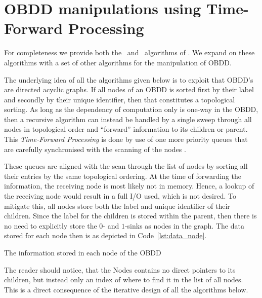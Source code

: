 \newpage
\section{OBDD manipulations using Time-Forward Processing} \label{sec:theory}

For completeness we provide both the \Reduce\ and \Apply\ algorithms of
\cite{Arge96}. We expand on these algorithms with a set of other algorithms for
the manipulation of OBDD.

The underlying idea of all the algorithms given below is to exploit that OBDD's
are directed acyclic graphs. If all nodes of an OBDD is sorted first by their
label and secondly by their unique identifier, then that constitutes a
topological sorting. As long as the dependency of computation only is one-way in
the OBDD, then a recursive algorithm can instead be handled by a single sweep
through all nodes in topological order and ``forward'' information to its
children or parent. This \emph{Time-Forward Processing} is done by use of one
more priority queues that are carefully synchronised with the scanning of the
nodes \todocite.

These queues are aligned with the scan through the list of nodes by sorting all
their entries by the same topological ordering. At the time of forwarding the
information, the receiving node is most likely not in memory. Hence, a lookup of
the receiving node would result in a full I/O used, which is not desired. To
mitigate this, all nodes store both the label and unique identifier of their
children. Since the label for the children is stored within the parent, then
there is no need to explicitly store the $0$- and $1$-sinks as nodes in the
graph. The data stored for each node then is as depicted in
Code~\ref{lst:data_node}.
\begin{lstfloat}[ht!]
  \centering

  

  \caption{The information stored in each node of the OBDD}
  \label{lst:data_node}
\end{lstfloat}

\noindent The reader should notice, that the Nodes contains no direct pointers
to its children, but instead only an index of where to find it in the list of
all nodes. This is a direct consequence of the iterative design of all the
algorithms below.


